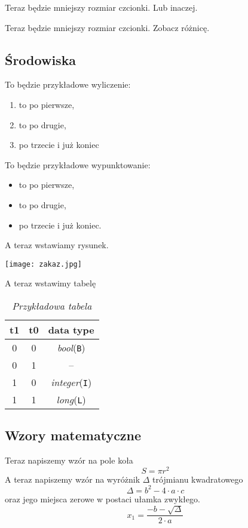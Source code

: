 \documentclass[a4paper, 12pt]{book}
\begin{document}
Teraz będzie {\small mniejszy rozmiar czcionki.} Lub inaczej.

Teraz będzie {\small mniejszy rozmiar czcionki.} Zobacz różnicę.

\subsection{Środowiska}
To będzie przykładowe wyliczenie:
\begin{enumerate}
\item to po pierwsze, 
\item to po drugie,
\item po trzecie i już koniec
\end{enumerate}
To będzie przykładowe wypunktowanie:
\begin{itemize}
\item to po pierwsze,
\item to po drugie,
\item po trzecie i już koniec.
\end{itemize}
A teraz wstawiamy rysunek.

\begin{center}
\texttt{[image: zakaz.jpg]}
\label{rys:da}
\end{center}
\clearpage
A teraz wstawimy tabelę
\begin{table}[h]
\caption{\textit{Przykładowa tabela}}
\label{tab:da}
\begin{center}
\begin{tabular}{| c c | c |}
\hline
t1 & t0 & data type\\
\hline
0 & 0 & \emph{bool}(\verb|B|)\\
0 & 1 & -- \\
1 & 0 & \emph{integer}(\verb|I|) \\
1 & 1 & \emph{long}(\verb|L|)\\
\hline
\end{tabular}
\end{center}
\end{table}

\subsection{Wzory matematyczne}
Teraz napiszemy wzór na pole koła
\begin{equation}
S = \pi r^{2}
\end{equation}
A teraz napiszemy wzór na wyróżnik $\Delta$ trójmianu kwadratowego
\begin{equation}
\label{formula}
\Delta = b^{2} - 4 \cdot a \cdot c
\end{equation}
oraz jego miejsca zerowe w postaci ułamka zwykłego.
\begin{equation}
x_1 = \frac{-b-\sqrt{\Delta}}{2\cdot a}
\end{equation}
\end{document}
